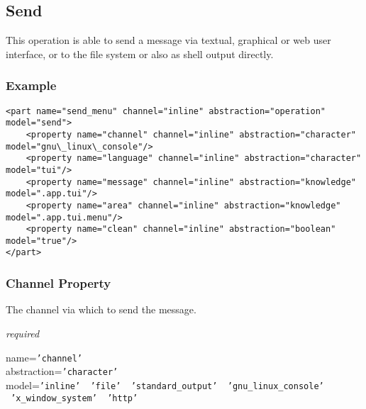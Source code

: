 %
%
%
%
%
%

\subsection{Send}
\label{send_heading}

This operation is able to send a message via textual, graphical or web user
interface, or to the file system or also as shell output directly.

\subsubsection{Example}

\begin{scriptsize}
    \begin{verbatim}
<part name="send_menu" channel="inline" abstraction="operation" model="send">
    <property name="channel" channel="inline" abstraction="character" model="gnu\_linux\_console"/>
    <property name="language" channel="inline" abstraction="character" model="tui"/>
    <property name="message" channel="inline" abstraction="knowledge" model=".app.tui"/>
    <property name="area" channel="inline" abstraction="knowledge" model=".app.tui.menu"/>
    <property name="clean" channel="inline" abstraction="boolean" model="true"/>
</part>
    \end{verbatim}
\end{scriptsize}

\subsubsection{Channel Property}

The channel via which to send the message.

\emph{required}

name=\texttt{'channel'}\\
abstraction=\texttt{'character'}\\
model=\texttt{'inline' \vline\ 'file' \vline\ 'standard\_output' \vline\ 'gnu\_linux\_console' \vline\ 'x\_window\_system' \vline\ 'http'}

